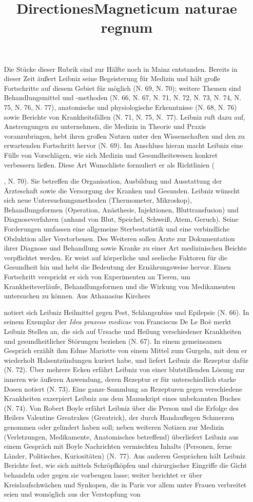 Die Stücke dieser Rubrik sind zur Hälfte noch in Mainz entstanden. Bereits in dieser Zeit äu{\ss}ert Leibniz seine Begeisterung für Medizin und hält gro{\ss}e Fortschritte auf diesem Gebiet für möglich (N. 69, N. 70); weitere Themen sind Behandlungsmittel und -methoden (N. 66, N. 67, N. 71, N. 72, N. 73, N. 74, N. 75, N. 76, N. 77), anatomische und physiologische Erkenntnisse (N. 68, N. 76) sowie Berichte von Krankheitsfällen (N. 71, N. 75, N.~77). Leibniz ruft dazu auf, Anstrengungen zu unternehmen, die Medizin in Theorie und Praxis voranzubringen, hebt ihren gro{\ss}en Nutzen unter den Wissenschaften und den zu erwartenden Fortschritt hervor (N. 69). Im Anschluss hieran macht Leibniz eine Fülle von Vorschlägen, wie sich Medizin und Gesundheitswesen konkret verbessern lie{\ss}en. Diese Art Wunschliste formuliert er als Richtlinien (\title{Directiones}, N. 70). Sie betreffen die Organisation, Ausbildung und Ausstattung der Ärzteschaft sowie die Versorgung der Kranken und Gesunden. Leibniz wünscht sich neue Untersuchungsmethoden (Thermometer, Mikroskop), Behandlungsformen (Operation, Anästhesie, Injektionen, Bluttransfusion) und Diagnoseverfahren (anhand von Blut, Speichel, Schwei{\ss}, Atem, Geruch). Seine Forderungen umfassen eine allgemeine Sterbestatistik und eine verbindliche Obduktion aller Verstorbenen. Des Weiteren sollen Ärzte zur Dokumentation ihrer Diagnose und Behandlung sowie Kranke zu einer Art medizinischen Beichte verpflichtet werden. Er weist auf körperliche und seelische Faktoren für die Gesundheit hin und hebt die Bedeutung der Ernährungsweise hervor. Einen Fortschritt verspricht er sich von Experimenten an Tieren, um Krankheitsverläufe, Behandlungsformen und die Wirkung von Medikamenten untersuchen zu können. Aus Athanasius Kirchers \title{Magneticum naturae regnum} notiert sich Leibniz Heilmittel gegen Pest, Schlangenbiss und Epilepsie (N. 66). In seinem Exemplar der \textit{Idea praxeos medicae} von Franciscus De Le Boë merkt Leibniz Stellen an, die sich auf Ursache und Heilung verschiedener Krankheiten und gesundheitlicher Störungen beziehen (N. 67). In einem gemeinsamen Gespräch erzählt ihm Edme Mariotte von einem Mittel zum Gurgeln, mit dem er wiederholt Halsentzündungen kuriert habe, und liefert Leibniz die Rezeptur dafür (N. 72). Über mehrere Ecken erfährt Leibniz von einer blutstillenden Lösung zur inneren wie äu{\ss}eren Anwendung, deren Rezeptur er für unterschiedlich starke Dosen notiert (N. 73). Eine ganze Sammlung an Rezepturen gegen verschiedene Krankheiten exzerpiert Leibniz aus dem Manuskript eines unbekannten Buches (N. 74). Von Robert Boyle erfährt Leibniz über die Person und die Erfolge des Heilers Valentine Greatrakes (Greatrick), der durch Handauflegen Schmerzen genommen oder gelindert haben soll; neben weiteren Notizen zur Medizin (Verletzungen, Medikamente, Anatomisches betreffend) überliefert Leibniz aus einem Gespräch mit Boyle Nachrichten vermischten Inhalts (Personen, ferne Länder, Politisches, Kuriositäten) (N.~77). Aus anderen Gesprächen hält Leibniz Berichte fest, wie sich mittels Schröpfköpfen und chi\-rurgischer Eingriffe die Gicht behandeln oder gegen sie vorbeugen lasse; weiter berichtet er über Kreislaufschwächen und Synkopen, die in Paris vor allem unter Frauen verbreitet seien und womöglich aus der Verstopfung von 